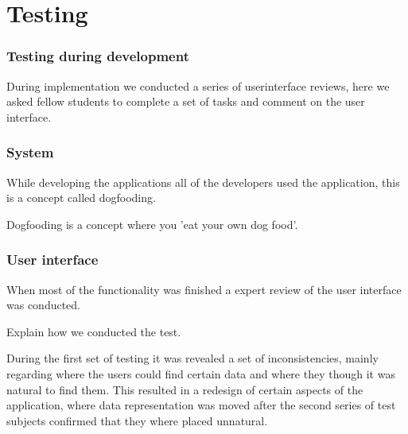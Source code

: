 \chapter{Testing}
\subsection{Testing during development}
During implementation we conducted a series of userinterface reviews, here we asked fellow students to complete a set of tasks and comment on the user interface. 

\subsection{System}
While developing the applications all of the developers used the application, this is a concept called dogfooding.

Dogfooding is a concept where you 'eat your own dog food'. 

\subsection{User interface}
When most of the functionality was finished a expert review of the user interface was conducted.

Explain how we conducted the test.

During the first set of testing it was revealed a set of inconsistencies, mainly regarding where the users could find certain data and where they though it was natural to find them. 
This resulted in a redesign of certain aspects of the application, where data representation was moved after the second series of test subjects confirmed that they where placed unnatural.
